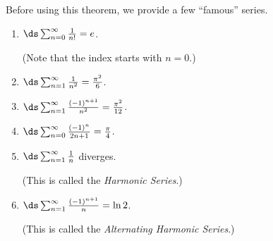 \enlargethispage{2\baselineskip}
Before using this theorem, we provide a few ``famous'' series.

\setboxwidth{20pt}
{\begin{enumerate}
\item	\parbox{90pt}{$\ds\sum_{n=0}^\infty \frac1{n!} = e$. } (Note that the index starts with $n=0$.)
\item	$\ds\sum_{n=1}^\infty \frac1{n^2} = \frac{\pi^2}{6}$.
\item	$\ds\sum_{n=1}^\infty \frac{(-1)^{n+1}}{n^2} = \frac{\pi^2}{12}$.
\item	$\ds\sum_{n=0}^\infty \frac{(-1)^{n}}{2n+1} = \frac{\pi}{4}$.
\item	\parbox{90pt}{$\ds\sum_{n=1}^\infty \frac{1}{n} $ \quad diverges.} (This is called the \emph{Harmonic Series}.)
\item	\parbox{90pt}{$\ds\sum_{n=1}^\infty \frac{(-1)^{n+1}}{n} = \ln 2$.} (This is called the \emph{Alternating Harmonic Series}.)
\end{enumerate}
}
\restoreboxwidth

